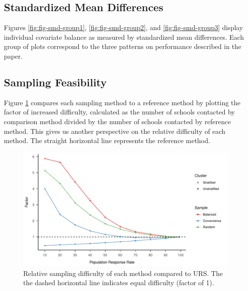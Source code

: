 \documentclass[
  man,floatsintext]{apa6}
\begin{document}
\hypertarget{SMD-results}{%
\subsection{Standardized Mean Differences}\label{SMD-results}}

Figures \ref{fig:fig-smd-group1}, \ref{fig:fig-smd-group2}, and \ref{fig:fig-smd-group3} display individual covariate balance as measured by standardized mean differences. Each group of plots correspond to the three patterns on performance described in the paper.







\newpage

\hypertarget{feasibility-results}{%
\subsection{Sampling Feasibility}\label{feasibility-results}}

Figure \ref{fig:fig-rel-per} compares each sampling method to a reference method by plotting the factor of increased difficulty, calculated as the number of schools contacted by comparison method divided by the number of schools contacted by reference method. This gives us another perspective on the relative difficulty of each method. The straight horizontal line represents the reference method.



\begin{figure}
\centering
\includegraphics{6---Paper_files/figure-latex/fig-rel-per-1.pdf}
\caption{\label{fig:fig-rel-per}Relative sampling difficulty of each method compared to URS. The the dashed horizontal line indicates equal difficulty (factor of 1).}
\end{figure}
\end{document}
